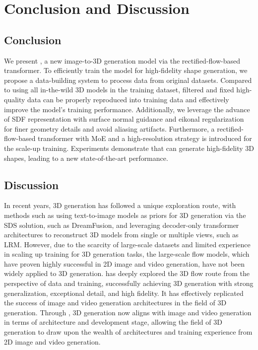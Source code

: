 \section{Conclusion and Discussion}


\subsection{Conclusion}
We present \method{}, a new image-to-3D generation model via the rectified-flow-based transformer. To efficiently train the model for high-fidelity shape generation, we propose a data-building system to process data from original datasets.
Compared to using all in-the-wild 3D models in the training dataset, filtered and fixed high-quality data can be properly reproduced into training data and effectively improve the model's training performance.
Additionally, we leverage the advance of SDF representation with surface normal guidance and eikonal regularization for finer geometry details and avoid aliasing artifacts.
Furthermore, a rectified-flow-based transformer with MoE and a high-resolution strategy is introduced for the scale-up training.
Experiments demonstrate that \method{} can generate high-fidelity 3D shapes, leading to a new state-of-the-art performance.

\subsection{Discussion}
In recent years, 3D generation has followed a unique exploration route, with methods such as using text-to-image models as priors for 3D generation via the SDS solution, such as DreamFusion\cite{poole2022dreamfusion}, and leveraging decoder-only transformer architectures to reconstruct 3D models from single or multiple views, such as LRM\cite{hong2023lrm}. However, due to the scarcity of large-scale datasets and limited experience in scaling up training for 3D generation tasks, the large-scale flow models, which have proven highly successful in 2D image and video generation, have not been widely applied to 3D generation. \method{} has deeply explored the 3D flow route from the perspective of data and training, successfully achieving 3D generation with strong generalization, exceptional detail, and high fidelity. It has effectively replicated the success of image and video generation architectures in the field of 3D generation. Through \method{}, 3D generation now aligns with image and video generation in terms of architecture and development stage, allowing the field of 3D generation to draw upon the wealth of architectures and training experience from 2D image and video generation.

